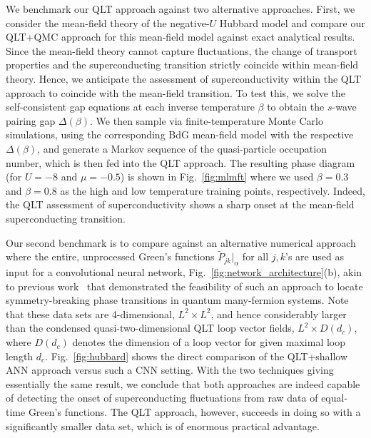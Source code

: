 \documentclass[amsmath,amssymb, aps, prx, longbibliography, twocolumn]{revtex4-1}
\begin{document}
We benchmark our QLT approach against two alternative approaches. 
First, we consider the mean-field theory of the negative-$U$ Hubbard model and compare our QLT+QMC approach for this
mean-field model against exact analytical results. Since the mean-field theory cannot capture fluctuations, the change of transport properties and the superconducting transition strictly coincide within mean-field theory. Hence, we anticipate the assessment of superconductivity within the QLT approach to coincide with the mean-field transition. To test this, we solve the self-consistent gap equations at  each inverse temperature $\beta$ to obtain the $s$-wave pairing gap $\Delta(\beta)$. We then sample via finite-temperature Monte Carlo simulations, using the corresponding BdG mean-field model with the respective $\Delta(\beta)$, and generate a Markov sequence of the quasi-particle occupation number, which is then fed into the QLT approach.
 The resulting phase diagram (for $U=-8$ and $\mu=-0.5$) is  shown in Fig.~\ref{fig:mlmft} where we used $\beta=0.3$ and $\beta=0.8$ as the high and low temperature training points, respectively. 
Indeed, the QLT assessment of superconductivity shows a sharp onset at the mean-field superconducting transition.

%
Our second benchmark is to compare against an alternative numerical approach where the entire, unprocessed Green's functions 
$\widetilde{P}_{jk}|_{\alpha}$ for all $j,k$'s are used as input for a convolutional neural network, Fig.~\ref{fig:network_architecture}(b), akin to previous work~\cite{Simon2016} that demonstrated the feasibility of such an approach to  locate symmetry-breaking phase transitions in quantum many-fermion systems. Note that these data sets are 4-dimensional, $L^2 \times L^2$, and hence considerably larger than the condensed quasi-two-dimensional QLT loop vector fields, $L^2 \times D(d_c)$, where $D(d_c)$ denotes the dimension of a loop vector for given maximal loop length $d_c$.
Fig.~\ref{fig:hubbard} shows the direct comparison of the QLT+shallow ANN approach versus such a CNN setting. With the two techniques giving essentially the same result, we conclude that  both approaches are indeed capable of detecting the onset of superconducting fluctuations from raw data of equal-time Green's functions. The QLT approach, however, succeeds in doing so with a significantly smaller data set, which is of enormous practical advantage.
\end{document}
